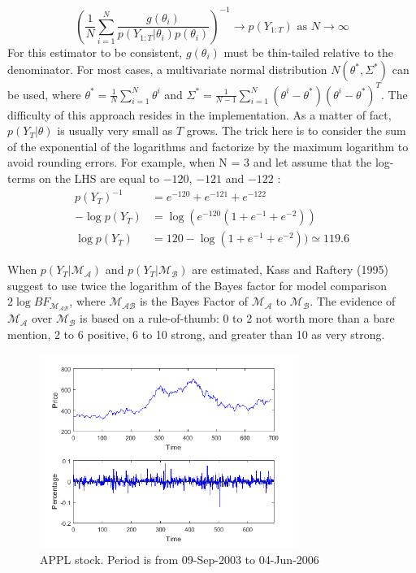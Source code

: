 \documentclass[11pt,a4,twosided,singlespacing,titlepagenumber=on]{scrreprt}
\numberwithin{equation}{chapter} %
\theoremstyle{remark}
\begin{document}
$$\left(\frac{1}{N} \sum_{i=1}^N \frac{g(\theta_i)}{p(Y_{1:T} | \theta_i) p(\theta_i)}\right)^{-1} \rightarrow p(Y_{1:T}) \text{ as } N \rightarrow \infty$$
For this estimator to be consistent, $g(\theta_i)$ must be thin-tailed relative to the denominator. For most cases, a multivariate normal distribution $N(\theta^*, \Sigma^*)$ can be used, where $\theta^* = \frac{1}{N} \sum_{i=1}^N \theta^i$ and $\Sigma^* = \frac{1}{N-1} \sum_{i=1}^N \left(\theta^i - \theta^*\right)\left(\theta^i - \theta^*\right)^T$. The difficulty of this approach resides in the implementation. As a matter of fact, $p(Y_T | \theta)$ is usually very small as $T$ grows. The trick here is to consider the sum of the exponential of the logarithms and factorize by the maximum logarithm to avoid rounding errors. For example, when N = 3 and let assume that the log-terms on the LHS are equal to $-120$, $-121$ and $-122$ :
\begin{align*}
p(Y_T)^{-1} &= e^{-120} + e^{-121} + e^{-122} \\
- \log p(Y_T) &= \log (e^{-120} ( 1 + e^{-1} + e^{-2})) \\
 \log p(Y_T) &= 120 - \log ( 1 + e^{-1} + e^{-2})) \simeq 119.6
\end{align*}

\noindent
When $p(Y_T | \mathcal{M_A})$ and $p(Y_T | \mathcal{M_B})$ are estimated, Kass and Raftery (1995) suggest to use twice the logarithm of the Bayes factor for model comparison $2 \log BF_{\mathcal{M_{AB}}}$, where $\mathcal{M_{AB}}$ is the Bayes Factor of $\mathcal{M_A}$ to $\mathcal{M_B}$. The evidence of $\mathcal{M_A}$ over $\mathcal{M_B}$ is based on a rule-of-thumb: 0 to 2 not worth more than a bare mention, 2 to 6 positive, 6 to 10 strong, and greater than 10 as very strong.


\begin{figure}[htb]
\centering
\includegraphics[width = 0.75\textwidth]{apple_2003_2006}
\caption{APPL stock. Period is from 09-Sep-2003 to 04-Jun-2006}
\label{apple_2003_2006}
\end{figure}
\end{document}

